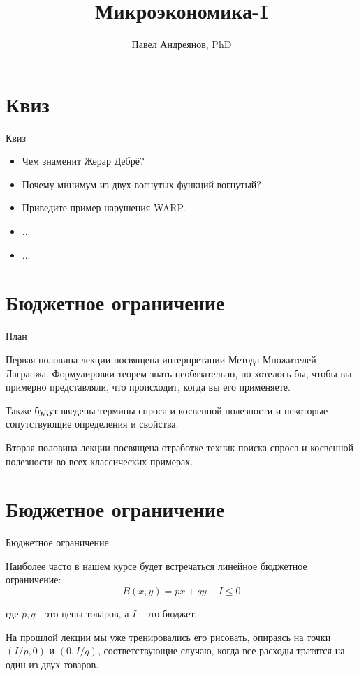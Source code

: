 \documentclass{beamer}
\title{
Микроэкономика-I
}
\author{
Павел Андреянов, PhD
}
\begin{document}
\maketitle

\section{Квиз}

\begin{frame}{Квиз}

\begin{itemize}
  \item Чем знаменит Жерар Дебрё? \pause
  \item Почему минимум из двух вогнутых функций вогнутый? \pause
  \item Приведите пример нарушения WARP. \pause
  \item ...
  \item ...
\end{itemize}

\end{frame}

\section{Бюджетное ограничение}

\begin{frame}{План}

Первая половина лекции посвящена интерпретации Метода Множителей Лагранжа. Формулировки теорем знать необязательно, но хотелось бы, чтобы вы примерно представляли, что происходит, когда вы его применяете. 

Также будут введены термины спроса и косвенной полезности и некоторые сопутствующие определения и свойства.

Вторая половина лекции посвящена отработке техник поиска спроса и косвенной полезности во всех классических примерах.

\end{frame}


\section{Бюджетное ограничение}

\begin{frame}{Бюджетное ограничение}

Наиболее часто в нашем курсе будет встречаться линейное бюджетное ограничение:
$$ B(x,y) = p x + q y - I \leqslant 0$$

где $p, q$ - это цены товаров, а $I$ - это бюджет. 

На прошлой лекции мы уже тренировались его рисовать, опираясь на точки $(I/p, 0)$ и $(0, I/q)$, соответствующие случаю, когда все расходы тратятся на один из двух товаров.

\end{frame}
\end{document}
